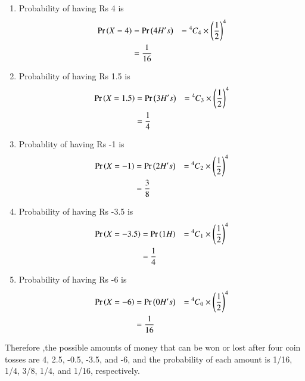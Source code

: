 \documentclass[journal,12pt,twocolumn]{IEEEtran}
\newcommand\Mycomb[2][^n]{\prescript{#1\mkern-0.5mu}{}C_{#2}}
\begin{document}
	

        \begin{enumerate}[label=(\roman*)]
	       \item	Probability of having Rs 4 is 
		       \begin{align}
			       \pr{X = 4} &= \pr{4 H's} &= \Mycomb[4]{4} \times \left(\frac{1}{2}\right)^4  \\
			       &= \frac{1}{16} 
			\end{align}
		\item  Probability of having Rs 1.5 is
		       \begin{align}
			       \pr{X = 1.5} &= \pr{3H's} &= \Mycomb[4]{3} \times \left(\frac{1}{2}\right)^4 \\
			       &= \frac{1}{4} 
			\end{align}
		\item Probablity of having Rs -1 is  
			\begin{align}
				\pr{X = -1} &= \pr{2H's} &= \Mycomb[4]{2} \times \left(\frac{1}{2}\right)^4 \\
			       &= \frac{3}{8} 
			\end{align}
		\item Probability of having Rs -3.5 is
		       \begin{align}
			       \pr{X = -3.5} &= \pr{1 H} &=\Mycomb[4]{1} \times \left(\frac{1}{2}\right)^4 \\
			       &= \frac{1}{4} 
			\end{align}
		\item Probability of having Rs -6 is 
		       \begin{align}
			       \pr{X = -6} &= \pr{0 H's} &= \Mycomb[4]{0} \times \left(\frac{1}{2}\right)^4 \\
			       &= \frac{1}{16} 
			\end{align}
	\end{enumerate}
	Therefore ,the possible amounts of money that can be won or lost after four coin tosses are 4, 2.5, -0.5, -3.5, and -6, and the probability of each amount is 1/16, 1/4, 3/8, 1/4, and 1/16, respectively.
\end{document}
